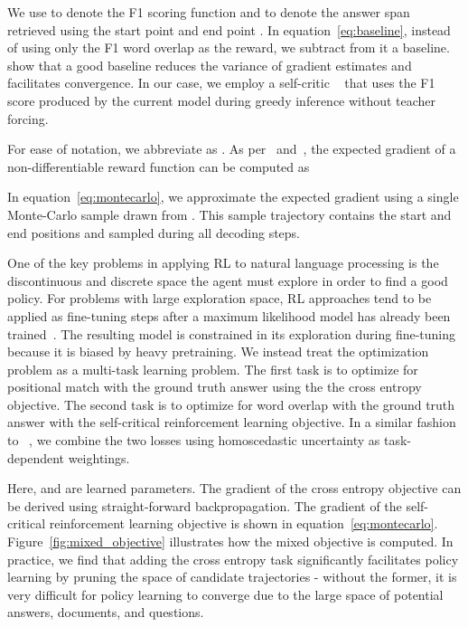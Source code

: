 \documentclass{article} \usepackage{iclr2018_conference,times}
\begin{document}
We use  to denote the F1 scoring function and  to denote the answer span retrieved using the start point  and end point .
In equation~\ref{eq:baseline}, instead of using only the F1 word overlap as the reward, we subtract from it a baseline.
~\citet{Greensmith2001VarianceRT} show that a good baseline reduces the variance of gradient estimates and facilitates convergence.
In our case, we employ a self-critic ~\citep{Konda1999ActorCriticA} that uses the F1 score produced by the current model during greedy inference without teacher forcing.

For ease of notation, we abbreviate  as .
As per~\citet{Sutton1999PolicyGM} and~\citet{Schulman2015GradientEU}, the expected gradient of a non-differentiable reward function can be computed as



In equation~\ref{eq:montecarlo}, we approximate the expected gradient using a single Monte-Carlo sample  drawn from .
This sample trajectory  contains the start and end positions  and  sampled during all decoding steps.

One of the key problems in applying RL to natural language processing is the discontinuous and discrete space the agent must explore in order to find a good policy.
For problems with large exploration space, RL approaches tend to be applied as fine-tuning steps after a maximum likelihood model has already been trained~\citep{Paulus2017ADR,wu2016google}.
The resulting model is constrained in its exploration during fine-tuning because it is biased by heavy pretraining.
We instead treat the optimization problem as a multi-task learning problem.
The first task is to optimize for positional match with the ground truth answer using the the cross entropy objective.
The second task is to optimize for word overlap with the ground truth answer with the self-critical reinforcement learning objective.
In a similar fashion to ~\citet{Kendall2017MultiTaskLU}, we combine the two losses using homoscedastic uncertainty as task-dependent weightings.



Here,  and  are learned parameters.
The gradient of the cross entropy objective can be derived using straight-forward backpropagation.
The gradient of the self-critical reinforcement learning objective is shown in equation~\ref{eq:montecarlo}.
Figure~\ref{fig:mixed_objective} illustrates how the mixed objective is computed.
In practice, we find that adding the cross entropy task significantly facilitates policy learning by pruning the space of candidate trajectories - without the former, it is very difficult for policy learning to converge due to the large space of potential answers, documents, and questions.
\end{document}

